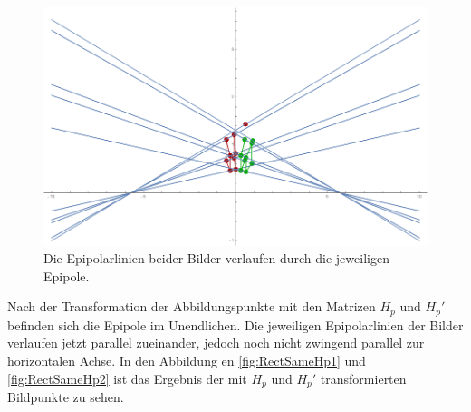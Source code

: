 \begin{figure}[!htb]
	\centering
	\includegraphics[width=.8\linewidth]{images/Rectification_two_same_Solutions.png}
	\caption[Epipolarlinien und Epipole vor der Rektifizierung]{Die Epipolarlinien beider Bilder verlaufen durch die jeweiligen Epipole.} 
	\label{fig:RectOriginalELines}
\end{figure}




Nach der Transformation der Abbildungspunkte mit den Matrizen $H_p$ und $H_p'$ befinden sich die Epipole im Unendlichen. Die jeweiligen Epipolarlinien der Bilder verlaufen jetzt parallel zueinander, jedoch noch nicht zwingend parallel zur horizontalen Achse. In den Abbildung en \ref{fig:RectSameHp1} und \ref{fig:RectSameHp2} ist das Ergebnis der mit $H_p$ und $H_p'$ transformierten Bildpunkte zu sehen.




